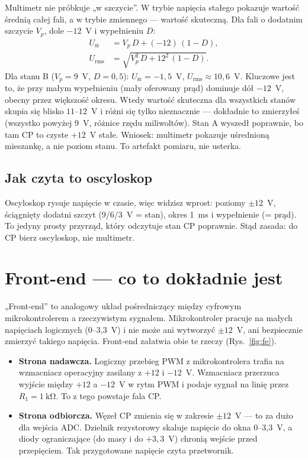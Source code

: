 \documentclass[11pt]{article}
\begin{document}
Multimetr nie próbkuje „w szczycie''. W trybie napięcia stałego pokazuje wartość średnią całej fali, a w trybie zmiennego --- wartość skuteczną. Dla fali o dodatnim szczycie $V_p$, dole $-12$~V i wypełnieniu $D$:
\begin{align}
U_{\text{śr}} &= V_p\,D + (-12)\,(1-D),\\
U_{\text{rms}} &= \sqrt{V_p^{2}\,D + 12^{2}\,(1-D)}.
\end{align}
Dla stanu B ($V_p=9$~V, $D=0{,}5$): $U_{\text{śr}}=-1{,}5$~V, $U_{\text{rms}}\approx 10{,}6$~V. Kluczowe jest to, że przy małym wypełnieniu (mały oferowany prąd) dominuje dół $-12$~V, obecny przez większość okresu. Wtedy wartość skuteczna dla wszystkich stanów skupia się blisko $11$--$12$~V i różni się tylko nieznacznie --- dokładnie to zmierzyłeś (wszystko powyżej 9~V, różnice rzędu miliwoltów). Stan A wyszedł poprawnie, bo tam CP to czyste $+12$~V stałe. Wniosek: multimetr pokazuje uśrednioną mieszankę, a nie poziom stanu. To artefakt pomiaru, nie usterka.

\subsection{Jak czyta to oscyloskop}

Oscyloskop rysuje napięcie w czasie, więc widzisz wprost: poziomy $\pm12$~V, ściągnięty dodatni szczyt (9/6/3~V = stan), okres 1~ms i wypełnienie (= prąd). To jedyny prosty przyrząd, który odczytuje stan CP poprawnie. Stąd zasada: do CP bierz oscyloskop, nie multimetr.

\section{Front-end --- co to dokładnie jest}

„Front-end'' to analogowy układ pośredniczący między cyfrowym mikrokontrolerem a rzeczywistym sygnałem. Mikrokontroler pracuje na małych napięciach logicznych (0--3{,}3~V) i nie może ani wytworzyć $\pm12$~V, ani bezpiecznie zmierzyć takiego napięcia. Front-end załatwia obie te rzeczy (Rys.~\ref{fig:fe}).

\begin{itemize}
 \item \textbf{Strona nadawcza.} Logiczny przebieg PWM z mikrokontrolera trafia na wzmacniacz operacyjny zasilany z $+12$ i $-12$~V. Wzmacniacz przerzuca wyjście między $+12$ a $-12$~V w rytm PWM i podaje sygnał na linię przez $R_1=1\ \mathrm{k\Omega}$. To z tego powstaje fala CP.
 \item \textbf{Strona odbiorcza.} Węzeł CP zmienia się w zakresie $\pm12$~V --- to za dużo dla wejścia ADC. Dzielnik rezystorowy skaluje napięcie do okna 0--3{,}3~V, a diody ograniczające (do masy i do $+3{,}3$~V) chronią wejście przed przepięciem. Tak przygotowane napięcie czyta przetwornik.
\end{itemize}
\end{document}
